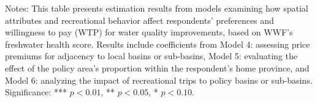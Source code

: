 {\begin{table}[H]
{\begin{tabular}{lllllll}
\midrule
\end{tabular}
}

\vspace{0.2em}

\small
Notes: This table presents estimation results from models examining how spatial attributes and recreational behavior affect 
respondents’ preferences and willingness to pay (WTP) for water quality improvements, based on WWF's freshwater health score. 
Results include coefficients from Model 4: assessing price premiums for adjacency to local basins or sub-basins, Model 5: 
evaluating the effect of the policy area’s proportion within the respondent’s home province, and Model 6: analyzing the impact 
of recreational trips to policy basins or sub-basins. Significance: *** $p < 0.01$, ** $p < 0.05$, * $p < 0.10$.
\end{table}
}